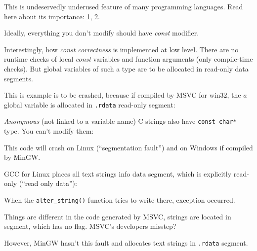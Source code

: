 \label{const_in_rdata}

This is undeservedly underused feature of many programming languages.
Read here about its importance:
\href{https://isocpp.org/wiki/faq/const-correctness}{1},
\href{https://stackoverflow.com/questions/136880/sell-me-on-const-correctness}{2}.

Ideally, everything you don't modify should have \emph{const} modifier.

Interestingly, how \emph{const correctness} is implemented at low level.
There are no runtime checks of local \emph{const} variables and function arguments (only compile-time checks).
But global variables of such a type are to be allocated in read-only data segments.

This is example is to be crashed, because if compiled by MSVC for win32,
the $a$ global variable is allocated in \verb|.rdata| read-only segment:



\emph{Anonymous} (not linked to a variable name) C strings also have \verb|const char*| type.
You can't modify them:



This code will crash on Linux (``segmentation fault'') and on Windows if compiled by MinGW.

GCC for Linux places all text strings info  data segment, which is explicitly read-only
(``read only data''):



When the \verb|alter_string()| function tries to write there, exception occurred.

Things are different in the code generated by MSVC, strings are located in  segment, which has no  flag.
MSVC's developers misstep?



However, MinGW hasn't this fault and allocates text strings in \verb|.rdata| segment.



